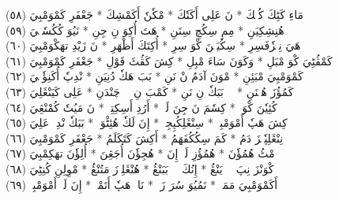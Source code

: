 \documentclass[a4paper, 10pt]{report}
\begin{document}
\begin{center}
\textarabic{(٥٨) \textcolor{mygreen}{مَاءِ كَٹِكَ كُٹٖكَ  * نَ عَلِى أَكَتٗكَ  * مْكٗنٗ أَكَمْشِكَ  * جَعْفَرِ كَمْوَمْبِيَ }} 
\\[5mm] 

\textarabic{(٥٩) \textcolor{mygreen}{وٖوٖ هُنِشِكِيَنِ  * مِمِ سِكُچِ سِنَنِ  * هَتَ أُكِوَ نِ جِنِ  * نَيُوَ كُكُسٗمٖيَ }} 
\\[5mm] 

\textarabic{(٦٠) \textcolor{mygreen}{هَيَ نِمٖزٗفَسِرِ  * سِكُيَنٖنَ كْوَ سِرِ  * أُكِتَكَ أَظْهَرِ  * نَ زَيْدِ تهَكْوَمْبِيَ }} 
\\[5mm] 

\textarabic{(٦١) \textcolor{mygreen}{كَمْڤُٹِيَ كْوَ مْبَلِ  * وَكَوَنَ سَاءَ مْبِلِ  * كِشَ كَڤُٹَ قَوْلِ  * جَعْفَرِ كَمْوَمْبِيَ }} 
\\[5mm] 

\textarabic{(٦٢) \textcolor{mygreen}{كَمْوَمْبِيَ مْبَئِنِ  * مْوَنَ آدَمُ نْ نَنِ  * بَبَ هَكٗ دُنِيَنِ  * نْدِپٗ أُكَنِؤٗنٖيَ }} 
\\[5mm] 

\textarabic{(٦٣) \textcolor{mygreen}{كَمُؤُزَ هُنٖنَنِ  * وٖوٖ بَبَكٗ نِ نَنِ  * كَمْبَ نِ پٖٹٖ چَنْدَنِ  * عَلِى كَيَنْڠَلِيَ }} 
\\[5mm] 

\textarabic{(٦٤) \textcolor{mygreen}{پٖٹٖ كُئِيٗنَ كْوَكٖ  * كِسٗمَ نَ جِنَ لَكٖ  * أَرُدِ أَسِكِتِكٖ  * نَ مَيُتٗ كُمْنْڠِيَ }} 
\\[5mm] 

\textarabic{(٦٥) \textcolor{mygreen}{كِشَ هَپٗ أَمْوَمْبِئٖ  * سِنْڠَلِكُپِجِئٖ  * إِنَ لَكٗ هُئِٹْوَيٖ  * بَبَكٗ نْدِيٖ عَلِيَ }} 
\\[5mm] 

\textarabic{(٦٦) \textcolor{mygreen}{نِنْڠَلِپٗتٖزَ دَمُ  * كَمَ سِكُكُفَهَمُ  * أَكِشَ كَتَكَلَمُ  * جَعْفَرِ كَمْوَمْبِيَ }} 
\\[5mm] 

\textarabic{(٦٧) \textcolor{mygreen}{وٖوٖ مْٹُ هُمُؤٗنَ  * هُمُؤُزِ لَكٖ إِنَ  * هُجِؤٗنَ أُجَڠِنَ  * أُلِؤٗنَ تهَكِمْبِيَ }} 
\\[5mm] 

\textarabic{(٦٨) \textcolor{mygreen}{كْوَنْزَ نِپَ پٖٹٖ يَنْڠُ  * إِنُكَ إٖوٖ بَبَنْڠُ  * هُنْڠَلِوٖزَ مَتُنْڠُ  * مْوِلِنِ كُنِٹِيَ }} 
\\[5mm] 

\textarabic{(٦٩) \textcolor{mygreen}{أَكَمْوَمْبِيَ مَمَكٖ  * نَمُيُوَ سُرَ زَكٖ  * نَاءٖ هَپٗ أَتَمْكٖ  * إِنَ لَكٖ أَمْوَمْبِيٖ }} 
\\[5mm] 


\end{center}
\end{document}
